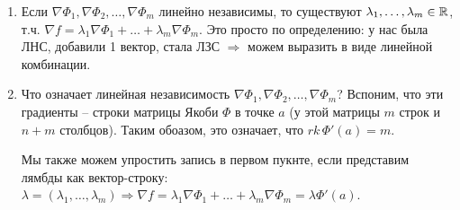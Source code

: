 \notice \begin{enumerate}
    \item Если $\nabla \Phi_1, \nabla \Phi_2, \dots, \nabla \Phi_m$ линейно независимы, то существуют $\lambda_1, \dots, \lambda_m \in \mathbb{R}$, т.ч. $\nabla f = \lambda_1 \nabla \Phi_1 + \dots + \lambda_m \nabla \Phi_m$.
    Это просто по определению: у нас была ЛНС, добавили 1 вектор, стала ЛЗС $\Rightarrow$ можем выразить в виде линейной комбинации.
    \item Что означает линейная независимость $\nabla \Phi_1, \nabla \Phi_2, \dots, \nabla \Phi_m$?
    Вспоним, что эти градиенты -- строки матрицы Якоби $\Phi$ в точке $a$ (у этой матрицы $m$ строк и $n+m$ столбцов).
    Таким обоазом, это означает, что $rk\, \Phi'(a) = m$.
    
    Мы также можем упростить запись в первом пукнте, если представим лямбды как вектор-строку: $\lambda = (\lambda_1, \dots, \lambda_m) \Longrightarrow \nabla f = \lambda_1 \nabla \Phi_1 + \dots + \lambda_m \nabla \Phi_m = \lambda \Phi'(a)$.
\end{enumerate}

